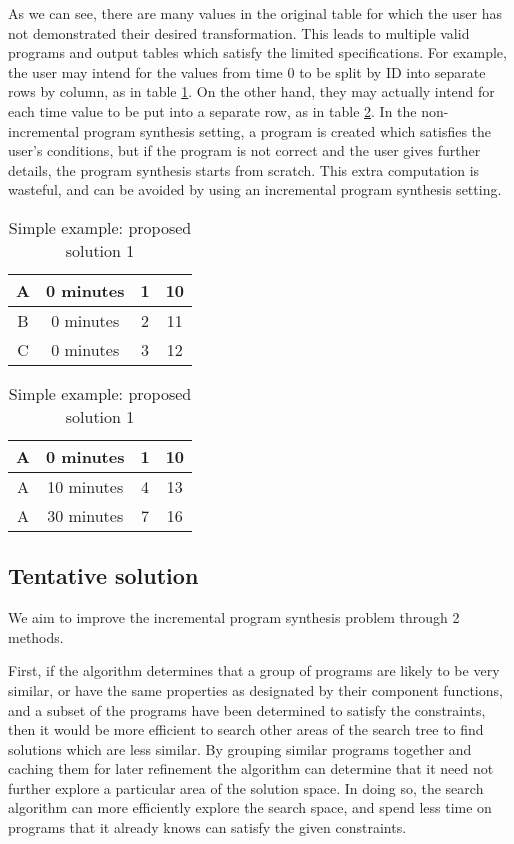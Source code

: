 As we can see, there are many values in the original table for which the user has not demonstrated their desired transformation. This leads to multiple valid programs and output tables which satisfy the limited specifications. For example, the user may intend for the values from time 0 to be split by ID into separate rows by column, as in table \ref{table:3}. On the other hand, they may actually intend for each time value to be put into a separate row, as in table \ref{table:4}. In the non-incremental program synthesis setting, a program is created which satisfies the user's conditions, but if the program is not correct and the user gives further details, the program synthesis starts from scratch. This extra computation is wasteful, and can be avoided by using an incremental program synthesis setting.

\begin{table}[h]
\centering
\begin{tabular}{|c|c|c|c|}
\hline
A & 0 minutes & 1 & 10 \\
\hline
B & 0 minutes & 2 & 11 \\
\hline
C & 0 minutes & 3 & 12 \\
\hline
\end{tabular}
\caption{Simple example: proposed solution 1}
\label{table:3}
\end{table}

\begin{table}[h]
\centering
\begin{tabular}{|c|c|c|c|}
\hline
A & 0 minutes & 1 & 10 \\
\hline
A & 10 minutes & 4 & 13 \\
\hline
A & 30 minutes & 7 & 16 \\
\hline
\end{tabular}
\caption{Simple example: proposed solution 1}
\label{table:4}
\end{table}

\subsection{Tentative solution}

We aim to improve the incremental program synthesis problem through 2 methods. 

First, if the algorithm determines that a group of programs are likely to be very similar, or have the same properties as designated by their component functions, and a subset of the programs have been determined to satisfy the constraints, then it would be more efficient to search other areas of the search tree to find solutions which are less similar. By grouping similar programs together and caching them for later refinement the algorithm can determine that it need not further explore a particular area of the solution space. In doing so, the search algorithm can more efficiently explore the search space, and spend less time on programs that it already knows can satisfy the given constraints.

